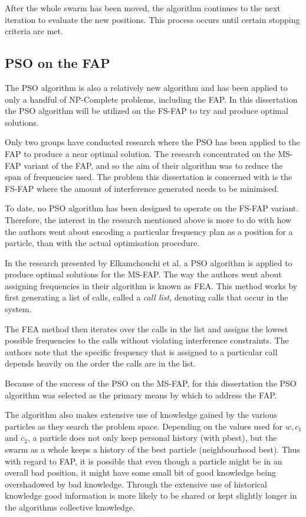 After the whole swarm has been moved, the algorithm continues to the next iteration to evaluate the new positions. This process occurs until certain stopping criteria are met.


\subsection{PSO on the \gls{FAP}}
\label{sec:psoonfap}
The \gls{PSO} algorithm is also a relatively new algorithm and has been applied to only a handful of NP-Complete problems, including the \gls{FAP}. In this dissertation the \gls{PSO} algorithm will be utilized on the \gls{FS-FAP} to try and produce optimal solutions. 

Only two groups have conducted research where the \gls{PSO} has been applied to the \gls{FAP} to produce a near optimal solution. The research concentrated on the \gls{MS-FAP} variant of the \gls{FAP}, and so the aim of their algorithm was to reduce the span of frequencies used. The problem this dissertation is concerned with is the \gls{FS-FAP} where the amount of interference generated needs to be minimised. 

To date, no \gls{PSO} algorithm has been designed to operate on the \gls{FS-FAP} variant. Therefore, the interest in the research mentioned above is more to do with how the authors went about encoding a particular frequency plan as a position for a particle, than with the actual optimisation procedure.

In the research presented by Elkamchouchi et al.\cite{EgyptFAPPSO} a \gls{PSO} algorithm is applied to produce optimal solutions for the \gls{MS-FAP}. The way the authors went about assigning frequencies in their algorithm is known as \gls{FEA}.
This method works by first generating a list of calls, called a \emph{call list}, denoting calls that occur in the system\cite{EgyptFAPPSO}. 

The \gls{FEA} method then iterates over the calls in the list and assigns the lowest possible frequencies to the calls without violating interference constraints\cite{EgyptFAPPSO}. The authors note that the specific frequency that is assigned to a particular call depends heavily on the order the calls are in the list\cite{EgyptFAPPSO}.

Because of the success of the \gls{PSO} on the \gls{MS-FAP}, for this dissertation the \gls{PSO} algorithm was selected as the primary means by which to address the \gls{FAP}.

The algorithm also makes extensive use of knowledge gained by the various particles as they search the problem space. Depending on the values used for $w, c_1$ and $c_2$, a particle does not only keep personal history (with pbest), but the swarm as a whole keeps a history of the best particle (neighbourhood best). Thus with regard to \gls{FAP}, it is possible that even though a particle might be in an overall bad position, it might have some small bit of good knowledge being overshadowed by bad knowledge. Through the extensive use of historical knowledge good information is more likely to be shared or kept slightly longer in the algorithms collective knowledge.

